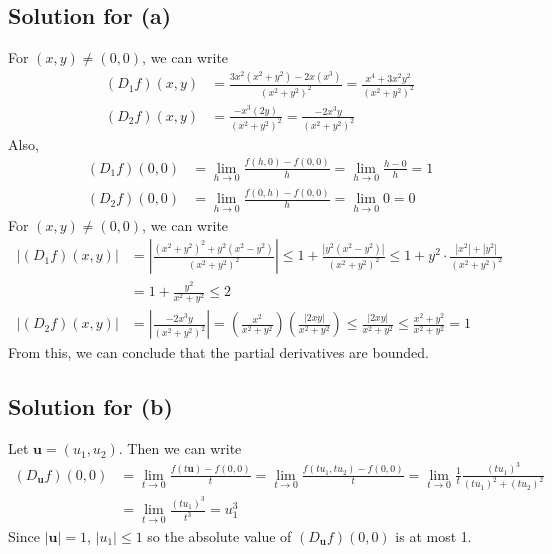 \documentclass{scrartcl}
\begin{document}
\subsection{Solution for (a)}
For \((x, y) \not = (0, 0)\), we can write
\begin{align*}
  (D_1 f) (x, y)
  &= \frac{3x^2 (x^2 + y^2) - 2x (x^3)}{(x^2 + y^2)^2}
  = \frac{x^4 + 3x^2 y^2}{(x^2 + y^2)^2} \\
  (D_2 f) (x, y)
  &= \frac{-x^3 (2y)}{(x^2 + y^2)^2}
  = \frac{-2x^3 y}{(x^2 + y^2)^2}
\end{align*}
Also,
\begin{align*}
  (D_1 f) (0, 0)
  &= \lim_{h \to 0} \frac{f(h, 0) - f(0, 0)}{h}
  = \lim_{h \to 0} \frac{h - 0}{h}
  = 1 \\
  (D_2 f) (0, 0)
  &= \lim_{h \to 0} \frac{f(0, h) - f(0, 0)}{h}
  = \lim_{h \to 0} 0
  = 0
\end{align*}
For \((x, y) \not = (0, 0)\), we can write
\begin{align*}
  |(D_1 f) (x, y)|
  &= \left| \frac{(x^2 + y^2)^2 + y^2 (x^2 - y^2)}{(x^2 + y^2)^2} \right|
  \le 1 + \frac{|y^2 (x^2 - y^2)|}{(x^2 + y^2)^2}
  \le 1 + y^2 \cdot \frac{|x^2| + |y^2|}{(x^2 + y^2)^2} \\
  &= 1 + \frac{y^2}{x^2 + y^2}
  \le 2 \\
  |(D_2 f) (x, y)|
  &= \left| \frac{-2x^3 y}{(x^2 + y^2)^2} \right|
  = \left( \frac{x^2}{x^2 + y^2} \right) \left( \frac{|2xy|}{x^2 + y^2} \right)
  \le \frac{|2xy|}{x^2 + y^2}
  \le \frac{x^2 + y^2}{x^2 + y^2}
  = 1
\end{align*}
From this, we can conclude that the partial derivatives are bounded.

\subsection{Solution for (b)}
Let \(\mathbf{u} = (u_1, u_2)\). Then we can write
\begin{align*}
  (D_\mathbf{u} f) (0, 0)
  &= \lim_{t \to 0} \frac{f(t\mathbf{u}) - f(0, 0)}{t}
  = \lim_{t \to 0} \frac{f(tu_1, tu_2) - f(0, 0)}{t}
  = \lim_{t \to 0} \frac{1}{t} \frac{(tu_1)^3}{(tu_1)^2 + (tu_2)^2} \\
  &= \lim_{t \to 0} \frac{(tu_1)^3}{t^3}
  = u^3_1
\end{align*}
Since \(|\mathbf{u}| = 1\), \(|u_1| \le 1\) so the absolute value of
\((D_\mathbf{u} f) (0, 0)\) is at most 1.
\end{document}
